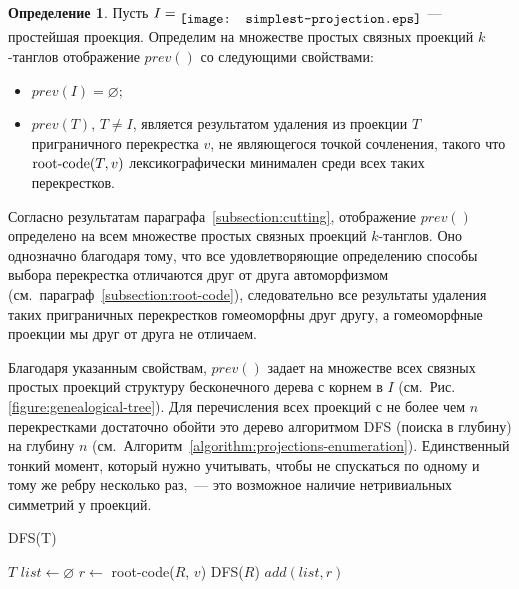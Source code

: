 \documentclass[12pt]{article}
\theoremstyle{plain}
\theoremstyle{definition}
\newtheorem{definition}{Определение}
\def\figureref#1{Рис.\,\protect\ref{#1}}
\def\RC{\hbox{root-code}}
\begin{document}
		\begin{definition}
			Пусть $I=\raise-0.4em\hbox{\texttt{[image: simplest-projection.eps]}}$ --- простейшая проекция. Определим на
			множестве простых связных проекций $k$-танглов отображение $prev()$ со следующими свойствами:
			\begin{itemize}
				\item $prev(I)=\varnothing;$
				\item $prev(T)$, $T\ne I$, является результатом удаления из проекции $T$ приграничного
				перекрестка $v$, не являющегося точкой сочленения, такого что $\RC(T,v)$
				лексикографически минимален среди всех таких перекрестков.
			\end{itemize}
		\end{definition}

		Согласно результатам параграфа~\ref{subsection:cutting}, отображение $prev()$ определено на всем
		множестве простых связных проекций $k$-танглов. Оно однозначно благодаря тому, что все
		удовлетворяющие определению способы выбора перекрестка отличаются друг от друга автоморфизмом
		(см.~параграф~\ref{subsection:root-code}), следовательно все результаты удаления таких
		приграничных перекрестков гомеоморфны друг другу, а гомеоморфные проекции мы друг от друга не
		отличаем.

		Благодаря указанным свойствам, $prev()$ задает на множестве всех связных простых проекций
		структуру бесконечного дерева с корнем в $I$ (см.~\figureref{figure:genealogical-tree}). Для
		перечисления всех проекций с не более чем $n$ перекрестками достаточно обойти это дерево
		алгоритмом DFS (поиска в глубину) на глубину $n$
		(см.~Алгоритм~\ref{algorithm:projections-enumeration}). Единственный тонкий момент, который нужно
		учитывать, чтобы не спускаться по одному и тому же ребру несколько раз,~--- это возможное наличие
		нетривиальных симметрий у проекций.

		\begin{algorithm}[ht]
			\footnotesize
			\caption{\small DFS(T)\label{algorithm:projections-enumeration}}
\begin{algorithmic}[1]
    \PRINT $T$
        \RETURN
    \ENDIF
    \STATE $list \leftarrow \varnothing$
                \STATE $r \leftarrow $ root-code($R$, $v$)
                    \STATE DFS($R$)
                    \STATE $add(list, r)$
                \ENDIF
            \ENDIF
        \ENDIF
    \ENDFOR
\end{algorithmic}
		\end{algorithm}
\end{document}
